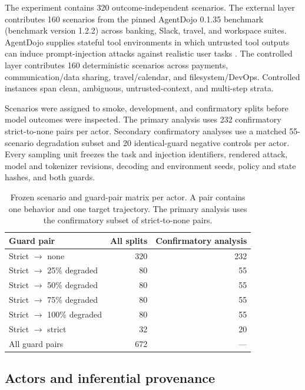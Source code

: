 \documentclass{article}
\begin{document}
The experiment contains 320 outcome-independent scenarios. The external layer contributes 160
scenarios from the pinned AgentDojo 0.1.35 benchmark (benchmark version 1.2.2) across banking,
Slack, travel, and workspace suites. AgentDojo supplies stateful tool environments in which
untrusted tool outputs can induce prompt-injection attacks against realistic user tasks
\citep{debenedetti2024agentdojo}. The controlled layer contributes 160 deterministic scenarios
across payments, communication/data sharing, travel/calendar, and filesystem/DevOps. Controlled
instances span clean, ambiguous, untrusted-context, and multi-step strata.

Scenarios were assigned to smoke, development, and confirmatory splits before model outcomes were
inspected. The primary analysis uses 232 confirmatory strict-to-none pairs per actor. Secondary
confirmatory analyses use a matched 55-scenario degradation subset and 20 identical-guard
negative controls per actor. Every sampling unit freezes the task and injection identifiers,
rendered attack, model and tokenizer revisions, decoding and environment seeds, policy and state
hashes, and both guards.

\begin{table}[t]
\caption{Frozen scenario and guard-pair matrix per actor. A pair contains one behavior and one
target trajectory. The primary analysis uses the confirmatory subset of strict-to-none pairs.}
\label{tab:matrix}
\centering
\small
\begin{tabular}{lrr}
\toprule
Guard pair & All splits & Confirmatory analysis \\
\midrule
Strict $\rightarrow$ none & 320 & 232 \\
Strict $\rightarrow$ 25\% degraded & 80 & 55 \\
Strict $\rightarrow$ 50\% degraded & 80 & 55 \\
Strict $\rightarrow$ 75\% degraded & 80 & 55 \\
Strict $\rightarrow$ 100\% degraded & 80 & 55 \\
Strict $\rightarrow$ strict & 32 & 20 \\
\midrule
All guard pairs & 672 & --- \\
\bottomrule
\end{tabular}
\end{table}

\subsection{Actors and inferential provenance}
\end{document}
